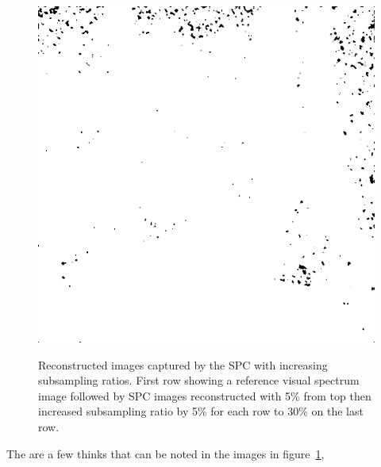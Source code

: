 \begin{figure}[H]
\begin{minipage}[t]{0.3\linewidth}
	\label{fig:hus_m30}
\end{minipage}
\begin{minipage}[t]{0.3\linewidth} %
	\includegraphics[width = 1\linewidth]{gfx/sit/sit_m30.png}
	\label{fig:sit_m30}
\end{minipage}
	\caption{Reconstructed images captured by the SPC with increasing subsampling ratios. First row showing a reference visual spectrum image followed by SPC images reconstructed with 5\% from top then increased subsampling ratio by 5\% for each row to 30\% on the last row.}
	\label{fig:subsampling_ratios}
\end{figure}

The are a few thinks that can be noted in the images in figure~\ref{fig:subsampling_ratios}, 

